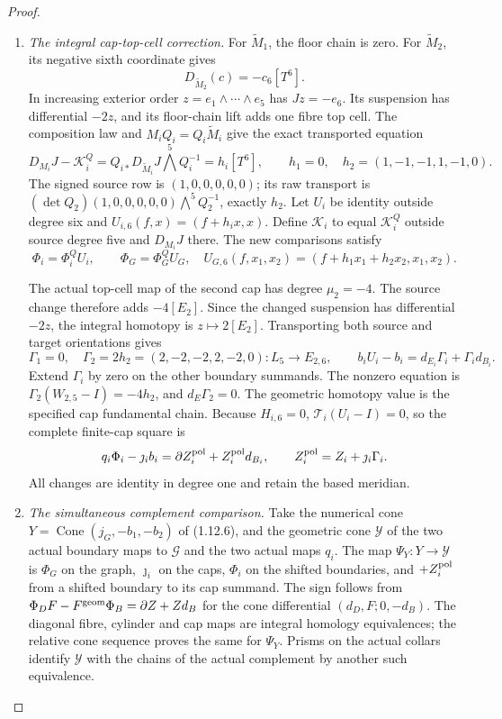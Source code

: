 \begin{proof}
\begin{enumerate}[label=\arabic*.]
\item \emph{The integral cap-top-cell correction.}
For $\widetilde M_1$, the floor chain is zero. For
$\widetilde M_2$, its negative sixth coordinate gives
\[
 D_{\widetilde M_2}(c)=-c_6[T^6].
\]
In increasing exterior order $z=e_1\wedge\cdots\wedge e_5$
has $Jz=-e_6$. Its suspension has differential $-2z$, and its
floor-chain lift adds one fibre top cell. The composition law and
$M_iQ_i=Q_i\widetilde M_i$ give the exact transported equation
\[
 D_{M_i}J-\mathcal K_i^Q
   =Q_{i*}D_{\widetilde M_i}J\bigwedge^5Q_i^{-1}=h_i[T^6],
 \qquad h_1=0,\quad h_2=(1,-1,-1,1,-1,0).
\]
The signed source row is $(1,0,0,0,0,0)$; its raw transport is
$(\det Q_2)(1,0,0,0,0,0)\bigwedge^5Q_2^{-1}$, exactly $h_2$.
Let $U_i$ be identity outside degree six and
$U_{i,6}(f,x)=(f+h_ix,x)$. Define $\mathcal K_i$ to equal
$\mathcal K_i^Q$ outside source degree five and $D_{M_i}J$ there.
The new comparisons satisfy
\[
 \Phi_i=\Phi_i^QU_i,\qquad \Phi_G=\Phi_G^QU_G,
 \quad U_{G,6}(f,x_1,x_2)=(f+h_1x_1+h_2x_2,x_1,x_2).
\]

The actual top-cell map of the second cap has degree $\mu_2=-4$.
The source change therefore adds $-4[E_2]$. Since the changed
suspension has differential $-2z$, the integral homotopy is
$z\mapsto2[E_2]$. Transporting both source and target orientations
gives
\[
 \Gamma_1=0,\quad
 \Gamma_2=2h_2=(2,-2,-2,2,-2,0):L_5\longrightarrow E_{2,6},
 \qquad b_iU_i-b_i=d_{E_i}\Gamma_i+\Gamma_i d_{B_i}.
\]
Extend $\Gamma_i$ by zero on the other boundary summands. The
nonzero equation is $\Gamma_2(W_{2,5}-I)=-4h_2$, and
$d_E\Gamma_2=0$. The geometric homotopy value is the specified cap
fundamental chain. Because $H_{i,6}=0$,
$\mathcal T_i(U_i-I)=0$, so the complete finite-cap square is
\[
 q_i\Phi_i-\jmath_i b_i
  =\partial Z_i^{\rm pol}+Z_i^{\rm pol}d_{B_i},\qquad
 Z_i^{\rm pol}=Z_i+\jmath_i\Gamma_i.
\]
All changes are identity in degree one and retain the based meridian.

\item \emph{The simultaneous complement comparison.}
Take the numerical cone $Y=\operatorname{Cone}(j_G,-b_1,-b_2)$
of (1.12.6), and the geometric cone $\mathcal Y$ of the two actual
boundary maps to $\mathcal G$ and the two actual maps $q_i$.
The map $\Psi_Y:Y\to\mathcal Y$ is $\Phi_G$ on the graph,
$\jmath_i$ on the caps, $\Phi_i$ on the shifted boundaries, and
$+Z_i^{\rm pol}$ from a shifted boundary to its cap summand.
The sign follows from
$\Phi_DF-F^{\rm geom}\Phi_B=\partial Z+Zd_B$
for the cone differential $(d_D,F;0,-d_B)$.
The diagonal fibre, cylinder and cap maps are integral homology
equivalences; the relative cone sequence proves the same for
$\Psi_Y$. Prisms on the actual collars identify $\mathcal Y$ with
the chains of the actual complement by another such equivalence.


\end{enumerate}
\end{proof}
